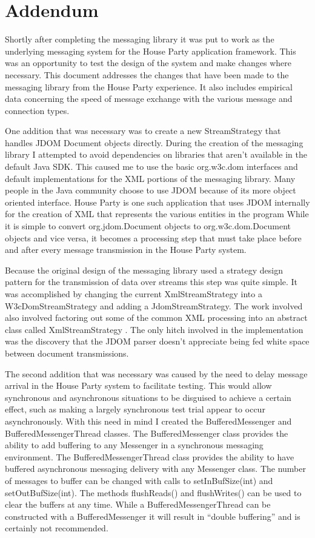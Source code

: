 \documentclass{article}
\begin{document}
\section{Addendum}

Shortly after completing the messaging library it was put to work as the
underlying messaging system for the House Party application framework.  This
was an opportunity to test the design of the system and make changes where
necessary.  This document addresses the changes that have been made to the
messaging library from the House Party experience.  It also includes empirical
data concerning the speed of message exchange with the various message and
connection types.

One addition that was necessary was to create a new StreamStrategy that
handles JDOM Document objects directly.  During the creation of the messaging
library I attempted to avoid dependencies on libraries that aren't available
in the default Java SDK.  This caused me to use the basic org.w3c.dom
interfaces and default implementations for the XML portions of the messaging
library.  Many people in the Java community choose to use JDOM because of its
more object oriented interface.  House Party is one such application that uses
JDOM internally for the creation of XML that represents the various entities in
the program  While it is simple to convert org.jdom.Document objects to
org.w3c.dom.Document objects and vice versa, it becomes a processing
step that must take place before and after every message transmission in the
House Party system.

Because the original design of the messaging library used a strategy
design pattern for the transmission of data over streams this step was
quite simple.  It was accomplished by changing the current
XmlStreamStrategy into a W3cDomStreamStrategy and adding a
JdomStreamStrategy.  The work involved also involved factoring out
some of the common XML processing into an abstract class called
XmlStreamStrategy .  The only hitch involved in the implementation was
the discovery that the JDOM parser doesn't appreciate being fed white
space between document transmissions.

The second addition that was necessary was caused by the need to delay message
arrival in the House Party system to facilitate testing.  This would allow
synchronous and asynchronous situations to be disguised to achieve a certain
effect, such as making a largely synchronous test trial appear to occur
asynchronously.  With this need in mind I created the BufferedMessenger
and BufferedMessengerThread classes.  The BufferedMessenger class provides
the ability to add buffering to any Messenger in a synchronous messaging
environment.  The BufferedMessengerThread class provides the ability to have
buffered asynchronous messaging delivery with any Messenger class.
The number of messages to buffer can be changed with calls to
setInBufSize(int) and setOutBufSize(int).  The methods flushReads()
and flushWrites() can be used to clear the buffers at any time.  While
a BufferedMessengerThread can be constructed with a BufferedMessenger
it will result in ``double buffering'' and is certainly not
recommended.
\end{document}
